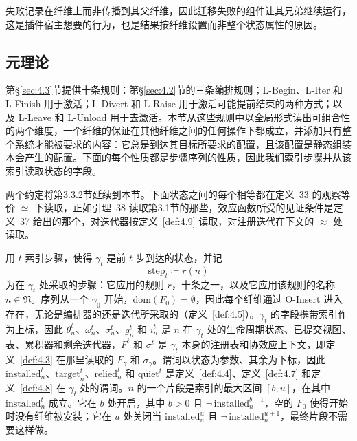失败记录在纤维上而非传播到其父纤维，因此迁移失败的组件让其兄弟继续运行，这是插件宿主想要的行为，也是结果按纤维设置而非整个状态属性的原因。

\subsection{元理论}\label{sec:4.4}

第\S\ref{sec:4.3}节提供十条规则：第\S\ref{sec:4.2}节的三条编排规则；L-Begin、L-Iter 和 L-Finish 用于激活；L-Divert 和 L-Raise 用于激活可能提前结束的两种方式；以及 L-Leave 和 L-Unload 用于去激活。本节从这些规则中以全局形式读出可组合性的两个维度，一个纤维的保证在其他纤维之间的任何操作下都成立，并添加只有整个系统才能被要求的内容：它总是到达其目标所要求的配置，且该配置是静态组装本会产生的配置。下面的每个性质都是步骤序列的性质，因此我们索引步骤并从该索引读取状态的字段。

两个约定将第3.3.2节延续到本节。下面状态之间的每个相等都在定义~33 的观察等价 $\simeq$ 下读取，正如引理~38 读取第3.1节的那些，效应函数所受的见证条件是定义~37 给出的那个，对迭代器按定义~\ref{def:4.9} 读取，对注册迭代在下文的 $\approx$ 处读取。

\begin{definition}\label{def:4.11}
用 $t$ 索引步骤，使得 $\gamma_t$ 是前 $t$ 步到达的状态，并记
\begin{equation}\label{eq:4.17}
\mathrm{step}_t \coloneqq r(n)
\end{equation}
为在 $\gamma_t$ 处采取的步骤：它应用的规则 $r$，十条之一，以及它应用该规则的名称 $n \in \mathfrak{N}$。序列从一个 $\gamma_0$ 开始，$\mathrm{dom}(F_0) = \emptyset$，因此每个纤维通过 O-Insert 进入存在，无论是编排器的还是迭代所采取的（定义~\ref{def:4.5}）。$\gamma_t$ 的字段携带索引作为上标，因此 $\theta^t_n$、$\omega^t_n$、$\sigma^t_n$、$g^t_n$ 和 $i^t_n$ 是 $n$ 在 $\gamma_t$ 处的生命周期状态、已提交视图、表、累积器和剩余迭代器，$F^t$ 和 $\sigma^t$ 是 $\gamma_t$ 本身的注册表和协效应上下文，即定义~\ref{def:4.3} 在那里读取的 $F_\gamma$ 和 $\sigma_\gamma$。谓词以状态为参数、其余为下标，因此 $\mathrm{installed}^t_n$、$\mathrm{target}^t_n$、$\mathrm{relied}^t_n$ 和 $\mathrm{quiet}^t$ 是定义~\ref{def:4.4}、定义~\ref{def:4.7} 和定义~\ref{def:4.8} 在 $\gamma_t$ 处的谓词。$n$ 的一个片段是索引的最大区间 $[b, u]$，在其中 $\mathrm{installed}^t_n$ 成立。它在 $b$ 处开启，其中 $b > 0$ 且 $\lnot\,\mathrm{installed}^{b-1}_n$，空的 $F_0$ 使得开始时没有纤维被安装；它在 $u$ 处关闭当 $\mathrm{installed}^u_n$ 且 $\lnot\,\mathrm{installed}^{u+1}_n$，最终片段不需要这样做。
\end{definition}

